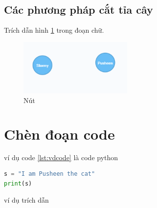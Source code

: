 \subsection{Các phương pháp cắt tỉa cây}




Trích dẫn hình \ref{fig:node} trong đoạn chữ. 

\begin{figure}[h]
\centering
\includegraphics[width=0.5\textwidth]{image/node.PNG}
\caption{\label{fig:node} Nút}
\end{figure}


\section{Chèn đoạn code}


ví dụ code \ref{lst:vdcode} là code python 


\begin{lstlisting}[caption={Đoạn code}, label={lst:vdcode}, language=python]
s = "I am Pusheen the cat"
print(s)
\end{lstlisting}

ví dụ trích dẫn \cite{robinson2013graph}











